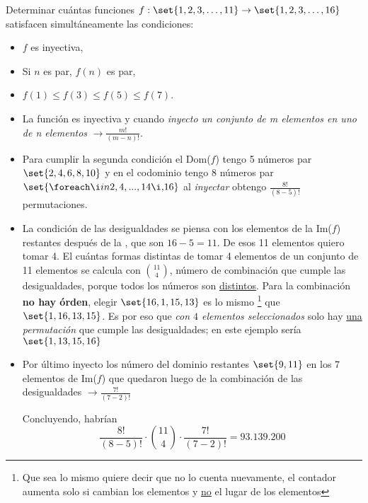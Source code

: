 \begin{enunciado}{\ejercicio}
  Determinar cuántas funciones $f: \set{1,2,3,\dots,11} \to \set{1,2,3,\dots,16}$ satisfacen simultáneamente las condiciones:
  \begin{multicols}{3}
    \begin{itemize}
      \item $f$ es inyectiva,
      \item Si $n$ es par, $f(n)$ es par,
      \item $f(1) \leq f(3) \leq f(5) \leq f(7)$.
    \end{itemize}
  \end{multicols}
\end{enunciado}

\begin{itemize}
  \item
        La función es inyectiva y cuando \textit{inyecto un conjunto de m elementos en uno de n elementos }
        $\to \frac{m!}{(m-n)!}$.

  \item
        Para cumplir la segunda condición el Dom($f$) tengo 5 números par $\set{2,4,6,8,10}$ y en el codominio tengo 8 números par
        $\set{\foreach \i in {2,4,...,14}{\i,}16}$ al \textit{inyectar} obtengo $\frac{8!}{(8-5)!}$ permutaciones.

  \item
        La condición de las desigualdades se piensa con los elementos de la Im($f$) restantes después de la , que son $16 - 5 = 11$.
        De esos 11 elementos quiero tomar 4. El cuántas formas distintas de tomar 4 elementos de un conjunto de 11 elementos se calcula con $\binom{11}{4}$,
        número de combinación que cumple las desigualdades, porque todos los números son \underline{distintos}. Para la combinación
        \textbf{no hay órden}, elegir $\set{16,1,15,13}$ es lo mismo
        \footnote{Que sea lo mismo quiere decir que no lo cuenta nuevamente, el contador aumenta solo si cambian los
          elementos y \underline{no} el lugar de los elementos}
        que $\set{1,16,13,15}$. Es por eso que \textit{con $4$ elementos seleccionados}
        solo hay \underline{una} \textit{permutación} que cumple las desigualdades; en este ejemplo sería $\set{1,13,15,16}$

  \item
        Por último inyecto los número del dominio restantes $\set{9,11}$ en los 7 elementos de Im($f$) que quedaron luego de la combinación de las
        desigualdades $\to \frac{7!}{(7-2)!}$

        Concluyendo, habrían
        $$
          \frac{8!}{(8-5)!} \cdot \binom{11}{4} \cdot \frac{7!}{(7-2)!} = 93.139.200
        $$
\end{itemize}

\begin{aportes}
  \item {}
\end{aportes}
